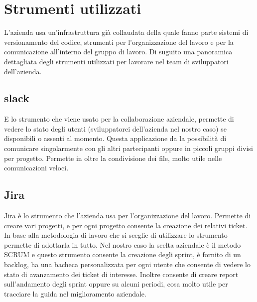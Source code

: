 \section{Strumenti utilizzati}

L'azienda usa un'infrastruttura già collaudata della quale fanno parte sistemi di versionamento del codice, strumenti per l'organizzazione del lavoro e per la comunicazione all'interno del gruppo di lavoro.
Di suguito una panoramica dettagliata degli strumenti utilizzati per lavorare nel team di sviluppatori dell'azienda.

\subsection*{slack}
E lo strumento che viene usato per la collaborazione aziendale, permette di vedere lo stato degli utenti (sviluppatorei dell'azienda
nel nostro caso) se disponibili o assenti al momento. Questa applicazione da la possibilità di comunicare singolarmente con gli altri
partecipanti oppure in piccoli gruppi divisi per progetto. Permette in oltre la condivisione dei file, molto utile nelle
comunicazioni veloci.

\subsection*{Jira}
Jira è lo strumento che l'azienda usa per l'organizzazione del lavoro. Permette di creare vari progetti, e per ogni progetto consente la
creazione dei relativi ticket. In base alla metodologia di lavoro che si sceglie di utilizzare lo strumento permette di adottarla in tutto.
Nel nostro caso la scelta aziendale è il metodo SCRUM e questo strumento consente la creazione degli sprint, è fornito di un backlog, ha
una bacheca personalizzata per ogni utente che consente di vedere lo stato di avanzamento dei ticket di interesse. Inoltre consente di creare
report sull'andamento degli sprint oppure su alcuni periodi, cosa molto utile per tracciare la guida nel miglioramento aziendale.

